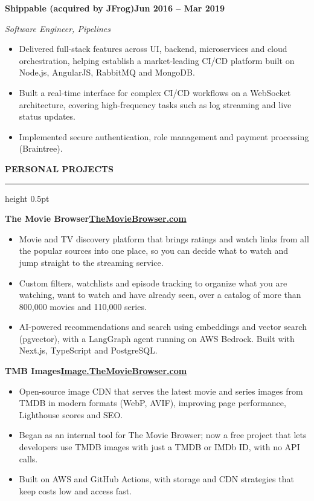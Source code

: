 \documentclass[10pt,letterpaper]{article}
\newcommand{\rsection}[1]{%
  \par\addvspace{11pt}%
  {\bfseries\MakeUppercase{#1}}\par\nobreak
  \vspace{2.5pt}\hrule height 0.5pt\nobreak\vspace{6pt}}
\newcommand{\entry}[3]{%
  \par\addvspace{7pt}%
  \textbf{#1}\hfill\textbf{#2}\par\nobreak
  \if\relax\detokenize{#3}\relax\else\textit{#3}\par\nobreak\fi}
\begin{document}
\entry{Shippable (acquired by JFrog)}{Jun 2016 -- Mar 2019}{Software Engineer, Pipelines}
\begin{itemize}
  \item Delivered full-stack features across UI, backend, microservices and cloud orchestration,
        helping establish a market-leading CI/CD platform built on Node.js, AngularJS, RabbitMQ and
        MongoDB.
  \item Built a real-time interface for complex CI/CD workflows on a WebSocket architecture, covering
        high-frequency tasks such as log streaming and live status updates.
  \item Implemented secure authentication, role management and payment processing (Braintree).
\end{itemize}


\rsection{Personal Projects}

\entry{The Movie Browser}{\href{https://themoviebrowser.com}{TheMovieBrowser.com}}{}
\begin{itemize}
  \item Movie and TV discovery platform that brings ratings and watch links from all the popular
        sources into one place, so you can decide what to watch and jump straight to the streaming
        service.
  \item Custom filters, watchlists and episode tracking to organize what you are watching, want to
        watch and have already seen, over a catalog of more than 800,000 movies and 110,000 series.
  \item AI-powered recommendations and search using embeddings and vector search (pgvector), with a
        LangGraph agent running on AWS Bedrock. Built with Next.js, TypeScript and PostgreSQL.
\end{itemize}

\entry{TMB Images}{\href{https://image.themoviebrowser.com}{Image.TheMovieBrowser.com}}{}
\begin{itemize}
  \item Open-source image CDN that serves the latest movie and series images from TMDB in modern
        formats (WebP, AVIF), improving page performance, Lighthouse scores and SEO.
  \item Began as an internal tool for The Movie Browser; now a free project that lets developers use
        TMDB images with just a TMDB or IMDb ID, with no API calls.
  \item Built on AWS and GitHub Actions, with storage and CDN strategies that keep costs low and
        access fast.
\end{itemize}
\end{document}
